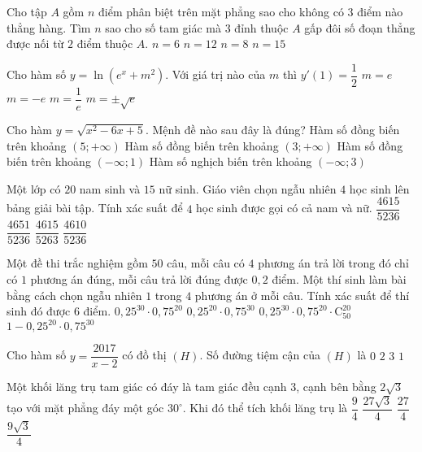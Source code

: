\begin{ex}%
	Cho tập $A$ gồm $n$ điểm phân biệt trên mặt phẳng sao cho không có $3$ điểm nào thẳng hàng. Tìm $n$ sao cho số tam giác mà $3$ đỉnh thuộc $A$ gấp đôi số đoạn thẳng được nối từ $2$ điểm thuộc $A$. 
	\choice
	{$n=6$}
	{$n=12$}
	{\True $n=8$}
	{$n=15$}
\end{ex}
\begin{ex}%
	Cho hàm số $y=\ln (e^x+m^2)$. Với giá trị nào của $m$ thì $y'(1)=\dfrac{1}{2}$
	\choice
	{$m=e$}
	{$m=- e$}
	{$m=\dfrac{1}{e}$}
	{\True $m=\pm \sqrt{e}$}
\end{ex}
\begin{ex}%
	Cho hàm $y=\sqrt{x^2-6x+5}$. Mệnh đề nào sau đây là đúng?
	\choice
	{\True Hàm số đồng biến trên khoảng $(5;+\infty)$}
	{Hàm số đồng biến trên khoảng $(3;+\infty)$}
	{Hàm số đồng biến trên khoảng $\left (- \infty; 1\right)$}
	{Hàm số nghịch biến trên khoảng $\left (- \infty; 3\right)$}
\end{ex}
\begin{ex}%
	Một lớp có $20$ nam sinh và $15$ nữ sinh. Giáo viên chọn ngẫu nhiên $4$ học sinh lên bảng giải bài tập. Tính xác suất để $4$ học sinh được gọi có cả nam và nữ. 
	\choice
	{\True $\dfrac{4615}{5236}$}
	{$\dfrac{4651}{5236}$}
	{$\dfrac{4615}{5263}$}
	{$\dfrac{4610}{5236}$}
\end{ex}
\begin{ex}%
	Một đề thi trắc nghiệm gồm $50$ câu, mỗi câu có $4$ phương án trả lời trong đó chỉ có $1$ phương án đúng, mỗi câu trả lời đúng được $0, 2$ điểm. Một thí sinh làm bài bằng cách chọn ngẫu nhiên $1$ trong $4$ phương án ở mỗi câu. Tính xác suất để thí sinh đó được $6$ điểm. 
	\choice
	{$0{,}25 ^{30}\cdot 0{,}75^{20}$}
	{$0{,}25 ^{20}\cdot 0{,}75^{30}$}
	{\True $0{,}25^{30}\cdot 0{,}75^{20}\cdot \mathrm{C} _{50}^{20} $}
	{$1-0{,}25^{20}\cdot 0{,}75^{30}$}
\end{ex}
\begin{ex}%
	Cho hàm số $y=\dfrac{2017}{x-2}$ có đồ thị $(H)$. Số đường tiệm cận của $(H)$ là
	\choice
	{$0$}
	{\True $2$}
	{$3$}
	{$1$}
\end{ex}
\begin{ex}%
	Một khối lăng trụ tam giác có đáy là tam giác đều cạnh $3$, cạnh bên bằng $2\sqrt{3}$ tạo với mặt phẳng đáy một góc $30^\circ$. Khi đó thể tích khối lăng trụ là
	\choice
	{$\dfrac{9}{4}$}
	{$\dfrac{27\sqrt{3}}{4}$}
	{\True $\dfrac{27}{4}$}
	{$\dfrac{9\sqrt{3}}{4} $}
\end{ex}

